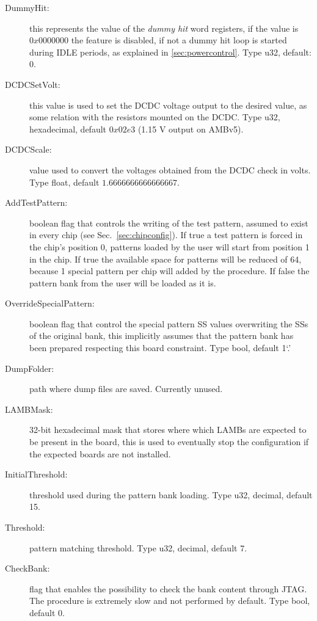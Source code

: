 \begin{description}
\item[DummyHit:] this represents the value of the \emph{dummy hit} word registers,
if the value is $0x0000000$ the feature is disabled, if not a dummy hit loop is
started during IDLE periods, as explained in \ref{sec:powercontrol}. Type u32,
default: 0.

\item[DCDCSetVolt:] this value is used to set the DCDC voltage output to the
desired value, as some relation with the resistors mounted on the DCDC. Type u32,
hexadecimal, default $0x02e3$ (1.15 V output on AMBv5).

\item[DCDCScale:] value used to convert the voltages obtained from the DCDC
check in volts. Type float, default $1.6666666666666667$.

\item[AddTestPattern:] boolean flag that controls the writing of the test pattern,
assumed to exist in every chip (see Sec.~\ref{sec:chipconfig}). If true a test
pattern is forced in the chip's position 0, patterns loaded by the user will start from
position 1 in the chip. If true the available space for patterns will be
reduced of 64, because 1 special pattern per chip will added by the procedure.
If false the pattern bank from the user will be loaded as it is.

\item[OverrideSpecialPattern:] boolean flag that control the special pattern
SS values overwriting the SSs of the original bank, this implicitly assumes 
that the pattern bank has been prepared respecting this board constraint.
Type bool, default 1`.'

\item[DumpFolder:] path where dump files are saved. Currently unused.

\item[LAMBMask:] 32-bit hexadecimal mask that stores where which LAMBs are expected
to be present in the board, this is used to eventually stop the configuration
if the expected boards are not installed.

\item[InitialThreshold:] threshold used during the pattern bank loading. Type u32,
decimal, default 15.

\item[Threshold:] pattern matching threshold. Type u32, decimal, default 7.

\item[CheckBank:] flag that enables the possibility to check the bank content
through JTAG. The procedure is extremely slow and not performed by default.
Type bool, default 0.


\end{description}
